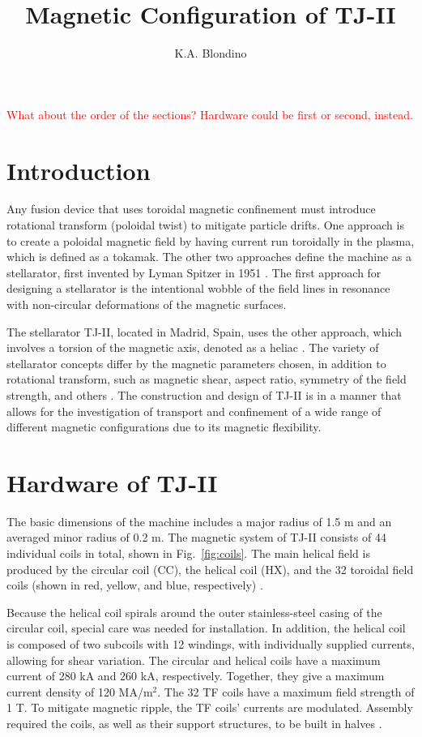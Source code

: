 \documentclass[a4paper]{article}
\author{K.A. Blondino}
\title{Magnetic Configuration of TJ-II}
\newcommand\mynotes[1]{\textcolor{red}{#1}}
\begin{document}
\maketitle

\mynotes{What about the order of the sections? Hardware could be first or second, instead.}

\section*{Introduction}
Any fusion device that uses toroidal magnetic confinement must introduce rotational transform (poloidal twist) to mitigate particle drifts.
One approach is to create a poloidal magnetic field by having current run toroidally in the plasma, which is defined as a tokamak.
The other two approaches define the machine as a stellarator, first invented by Lyman Spitzer in 1951 \cite{boozer_what_1998}. 
The first approach for designing a stellarator is the intentional wobble of the field lines in resonance with non-circular deformations of the magnetic surfaces.

The stellarator TJ-II, located in Madrid, Spain, uses the other approach, which involves a torsion of the magnetic axis, denoted as a heliac \cite{boozer_what_1998}.
The variety of stellarator concepts differ by the magnetic parameters chosen, in addition to rotational transform, such as magnetic shear, aspect ratio, symmetry of the field strength, and others \cite{iaea_fusion_2012}.
The construction and design of TJ-II is in a manner that allows for the investigation of transport and confinement of a wide range of different magnetic configurations due to its magnetic flexibility.


\section*{Hardware of TJ-II}
The basic dimensions of the machine includes a major radius of 1.5 m and an averaged minor radius of 0.2 m.
The magnetic system of TJ-II consists of 44 individual coils in total, shown in Fig.~\ref{fig:coils}.
The main helical field is produced by the circular coil (CC), the helical coil (HX), and the 32 toroidal field coils (shown in red, yellow, and blue, respectively) \cite{tj-ii_nodate}.

Because the helical coil spirals around the outer stainless-steel casing of the circular coil, special care was needed for installation.
In addition, the helical coil is composed of two subcoils with 12 windings, with individually supplied currents, allowing for shear variation.
The circular and helical coils have a maximum current of 280 kA and 260 kA, respectively.
Together, they give a maximum current density of 120 MA/m$^2$.
The 32 TF coils have a maximum field strength of 1 T.
To mitigate magnetic ripple, the TF coils' currents are modulated.
Assembly required the coils, as well as their support structures, to be built in halves \cite{ascasibar_overview_2001}.
\end{document}
